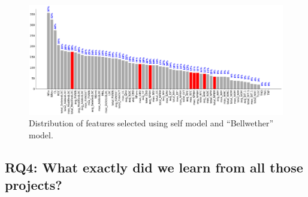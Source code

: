 \documentclass[10pt,journal,compsoc]{IEEEtran}
\begin{document}



\begin{figure}[h]
    \centering
    \includegraphics[width=\linewidth]{figs/FSS_compare.png}
    \caption{Distribution of features selected using self model and ``Bellwether'' model.}
    \label{fig:FSS_compare}
\end{figure}

\subsection*{RQ4: What exactly did we learn from all those projects?}
\label{sec:rq5}
\end{document}
